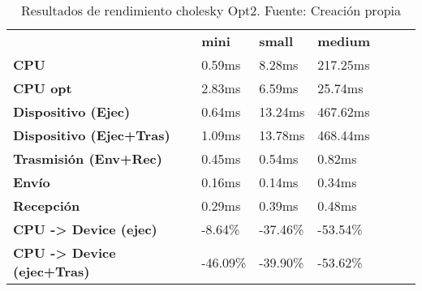 \begin{table}[H]
    \centering
    \begin{tabular}{lllllll}
    \rowcolor[HTML]{DAE8FC} \ &  \textbf{mini} &  \textbf{	small} &  \textbf{	medium} \\
    \cellcolor[HTML]{DAE8FC} \textbf{CPU} & 0.59ms & 	8.28ms & 	217.25ms \\
    \rowcolor[HTML]{EFEFEF} \cellcolor[HTML]{DAE8FC} \textbf{CPU opt} & 2.83ms & 	6.59ms & 	25.74ms \\
    \cellcolor[HTML]{DAE8FC} \textbf{Dispositivo (Ejec)} & 0.64ms & 	13.24ms & 	467.62ms \\
    \rowcolor[HTML]{EFEFEF} \cellcolor[HTML]{DAE8FC} \textbf{Dispositivo (Ejec+Tras)} & 1.09ms & 	13.78ms & 	468.44ms \\
    \cellcolor[HTML]{DAE8FC} \textbf{Trasmisión (Env+Rec)} & 0.45ms & 	0.54ms & 	0.82ms \\
    \rowcolor[HTML]{EFEFEF} \cellcolor[HTML]{DAE8FC} \textbf{Envío} & 0.16ms & 	0.14ms & 	0.34ms \\
    \cellcolor[HTML]{DAE8FC} \textbf{Recepción} & 0.29ms & 	0.39ms & 	0.48ms \\
    \rowcolor[HTML]{EFEFEF} \cellcolor[HTML]{DAE8FC} \textbf{CPU -> Device (ejec)} & -8.64\% & 	-37.46\% & 	-53.54\% \\
    \cellcolor[HTML]{DAE8FC} \textbf{CPU -> Device (ejec+Tras)} & -46.09\% & 	-39.90\% & 	-53.62\% \\
    \end{tabular}
    \caption[Resultados de rendimiento cholesky Opt2]{{Resultados de rendimiento cholesky Opt2. Fuente: Creación propia}}
    \label{table_test_cholesky_Opt2_hw_performanceResults}
\end{table}